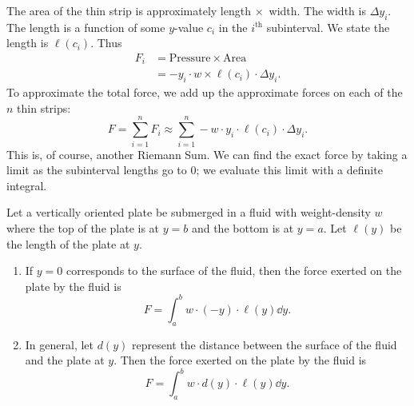 The area of the thin strip is approximately length $\times$\ width. The width is $\Delta y_i$. The length is a function of some $y$-value $c_i$ in the $i^{\text{th}}$ subinterval. We state the length is $\ell(c_i)$. Thus 
\begin{align*}
	F_i	&= \text{Pressure} \times \text{Area} \\
		&=	-y_i\cdot w \times \ell(c_i)\cdot\Delta y_i.
\end{align*}
To approximate the total force, we add up the approximate forces on each of the $n$ thin strips:
\[
F = \sum_{i=1}^n F_i \approx \sum_{i=1}^n -w\cdot y_i\cdot\ell(c_i)\cdot\Delta y_i.
\]
This is, of course, another Riemann Sum. We can find the exact force by taking a limit as the subinterval lengths go to 0; we evaluate this limit with a definite integral.

\begin{keyidea}\label{idea:fluid_force}%
Let a vertically oriented plate be submerged in a fluid with weight-density $w$ where the top of the plate is at $y=b$ and the bottom is at $y=a$. Let $\ell(y)$ be the length of the plate at $y$.
\begin{enumerate}
	\item	If $y=0$ corresponds to the surface of the fluid, then the force exerted on the plate by the fluid is
	\[F=\int_a^b w\cdot(-y)\cdot\ell(y)\dd y.\]
	\item	In general, let $d(y)$ represent the distance between the surface of the fluid and the plate at $y$. Then the force exerted on the plate by the fluid is 
	\[F=\int_a^b w\cdot d(y)\cdot\ell(y)\dd y.\]
\end{enumerate}
\end{keyidea}

